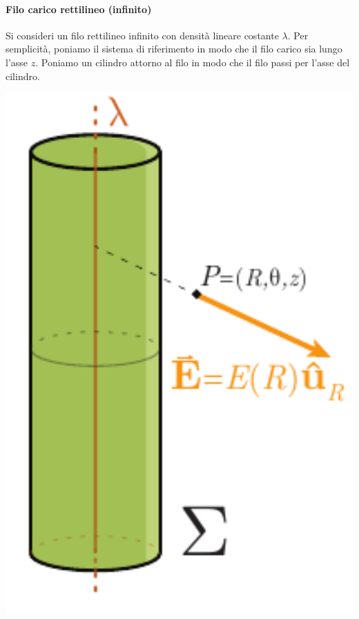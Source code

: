 \paragraph{Filo carico rettilineo (infinito)}
	Si consideri un filo rettilineo infinito con densità lineare costante $\lambda$. Per semplicità, poniamo il sistema di riferimento in modo che il filo carico sia lungo l'asse $z$. Poniamo un cilindro attorno al filo in modo che il filo passi per l'asse del cilindro.\\
	\begin{minipage}{0.29\textwidth}
		\begin{center}
			\includegraphics[width=1\textwidth]{images/chp2filoinfinito.pdf}
		\end{center}		%
	\end{minipage}\hspace{10pt}
